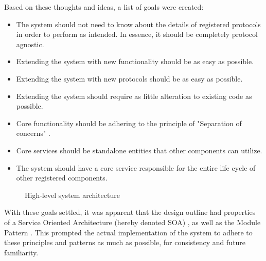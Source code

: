 Based on these thoughts and ideas, a list of goals were created:

\begin{itemize}
\item The system should not need to know about the details of registered protocols in order to perform as intended. In essence, it should be completely protocol agnostic.
\item Extending the system with new functionality should be as easy as possible.
\item Extending the system with new protocols should be as easy as possible.
\item Extending the system should require as little alteration to existing code as possible.
\item Core functionality should be adhering to the principle of "Separation of concerns" \cite{soc}.
\item Core services should be standalone entities that other components can utilize.
\item The system should have a core service responsible for the entire life cycle of other registered components.
\end{itemize}

\begin{center}
  \begin{figure}[ht!]
    \caption{High-level system architecture}
    \label{fig:abstract_architecture}
  \end{figure}
\end{center}

With these goals settled, it was apparent that the design outline had properties of a Service Oriented Architecture (hereby denoted SOA) \cite{soa}, as well as the Module Pattern \cite{module-pattern}. This prompted the actual implementation of the system to adhere to these principles and patterns as much as possible, for consistency and future familiarity.

